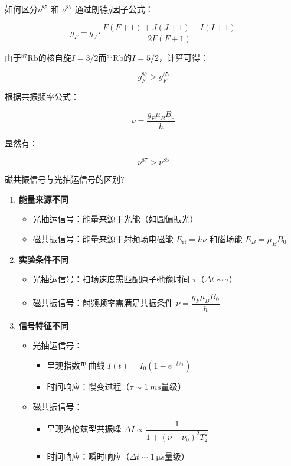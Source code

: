 \begin{ubox}
{如何区分$\nu^{85}$ 和 $\nu^{87}$}
    通过朗德$g$因子公式：

$$ 
g_{F} = g_{J} \cdot \frac{F(F+1) + J(J+1) - I(I+1)}{2F(F+1)} 
$$

由于${}^{87}\mathrm{Rb}$的核自旋$I=3/2$而${}^{85}\mathrm{Rb}$的$I=5/2$，计算可得：

$$ 
g_{F}^{87} > g_{F}^{85}
$$

根据共振频率公式：

$$ 
\nu = \frac{g_{F} \mu_{B} B_{0}}{h} 
$$

显然有：

$$ 
\nu^{87} > \nu^{85}
$$
\end{ubox}
\begin{ubox}
    {磁共振信号与光抽运信号的区别?}
    
\begin{enumerate}[label=(\arabic*), leftmargin=2em]
    \item \textbf{能量来源不同}
    \begin{itemize}[leftmargin=3em]
        \item 光抽运信号：能量来源于光能（如圆偏振光）
        \item 磁共振信号：能量来源于射频场电磁能 $E_{\text{rf}} = h\nu$ 和磁场能 $E_B = \mu_B B_0$
    \end{itemize}

    \item \textbf{实验条件不同}
    \begin{itemize}[leftmargin=3em]
        \item 光抽运信号：扫场速度需匹配原子弛豫时间 $\tau$（$\Delta t \sim \tau$）
        \item 磁共振信号：射频频率需满足共振条件 $\nu = \dfrac{g_F \mu_B B_0}{h}$
    \end{itemize}

    \item \textbf{信号特征不同}
    \begin{itemize}[leftmargin=3em]
        \item 光抽运信号：
        \begin{itemize}
            \item 呈现指数型曲线 $I(t) = I_0(1-e^{-t/\tau})$
            \item 时间响应：慢变过程（$\tau \sim \SI{1}{ms}$量级）
        \end{itemize}
        \item 磁共振信号：
        \begin{itemize}
            \item 呈现洛伦兹型共振峰 $\Delta I \propto \dfrac{1}{1+(\nu-\nu_0)^2 T_2^2}$
            \item 时间响应：瞬时响应（$\Delta t \sim \SI{1}{\micro s}$量级）
        \end{itemize}
    \end{itemize}
\end{enumerate}

\end{ubox}
